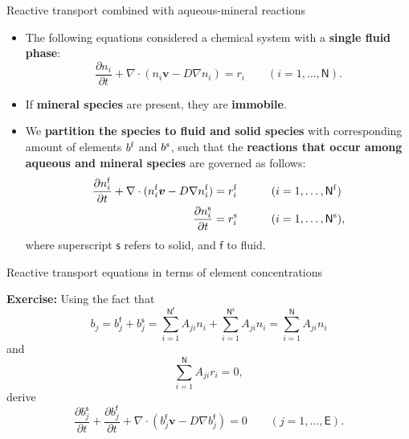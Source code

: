 %
%
\begin{frame}[<+->]{Reactive transport combined with aqueous-mineral reactions}
\begin{itemize}
\item The following equations considered a chemical system with 
a {\bf single fluid phase}:
\[
\frac{\partial n_{i}}{\partial t}+\nabla\cdot(n_{i}\boldsymbol{v}-D\nabla n_{i})=r_{i}\qquad(i=1,\ldots,\mathsf{N}).
\]
\item If \alert{\bf mineral species} are present, they are \alert{\bf immobile}. 
\item We \alert{\bf partition the species to fluid and solid species} with corresponding amount of elements $b^{\rm f}$ and $b^{\rm s}$, such that the {\bf reactions that occur among
aqueous and mineral species} are governed as follows:
%
\begin{alignat*}{2}
\frac{\partial n^{\rm f}_{i}}{\partial t}+\nabla\cdot(n^{\rm f}_{i}\boldsymbol{v}-D\nabla n^{\rm f}_{i}) & =r^{\rm f}_{i} & \qquad & (i=1,\ldots,\mathsf{N^{\rm f}})\\
\frac{\partial n^{\rm s}_{i}}{\partial t} & =r^{\rm s}_{i} &  & (i=1,\ldots,\mathsf{N^{\rm s}}),
\end{alignat*}
%
where superscript $\mathsf{s}$ refers to solid, and $\mathsf{f}$
to fluid.
\end{itemize}
\end{frame}
%
\begin{frame}{Reactive transport equations in terms of element concentrations}

\textbf{Exercise:} Using the fact that
\[
b_{j}=b_{j}^{\mathsf{f}}+b_{j}^{\mathsf{s}}=\sum_{i=1}^{\mathsf{N^{f}}}A_{ji}n_{i}+\sum_{i=1}^{\mathsf{N^{s}}}A_{ji}n_{i}=\sum_{i=1}^{\mathsf{N}}A_{ji}n_{i}
\]
and
\[
\sum_{i=1}^{\mathsf{N}}A_{ji}r_{i}=0,
\]
%
derive
\[
\frac{\partial b_{j}^{\mathsf{s}}}{\partial t}+\frac{\partial b_{j}^{\mathsf{f}}}{\partial t}+\nabla\cdot(b_{j}^{\mathsf{f}}\boldsymbol{v}-D\nabla b_{j}^{\mathsf{f}})=0\qquad(j=1,\ldots,\mathsf{E}).
\]

\end{frame}
%
